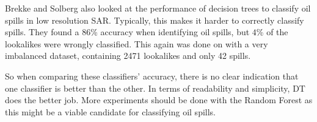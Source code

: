 Brekke and Solberg also looked at the performance of decision trees to classify oil spills in low resolution SAR. Typically, this makes it harder to correctly classify spills. They found a $86$\% accuracy when identifying oil spills, but $4$\% of the lookalikes were wrongly classified. This again was done on with a very imbalanced dataset, containing 2471 lookalikes and only 42 spills.

So when comparing these classifiers' accuracy, there is no clear indication that one classifier is better than the other. In terms of readability and simplicity, DT does the better job. More experiments should be done with the Random Forest as this might be a viable candidate for classifying oil spills.